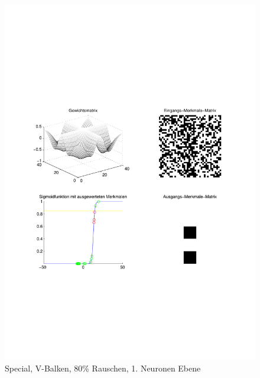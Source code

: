 \begin{figure}[hbt]
	\begin{minipage}{0.8 \textwidth}
		\includegraphics[width=\textwidth]{./Bilder/Auswertung/Endergebnis/TypeSpecial_Rauschen80_V_Line_Layer1}
		\caption{Special, V-Balken, 80\% Rauschen, 1. Neuronen Ebene}
		\label{Special_V_80_1}
	\end{minipage}
	\vfill
	\begin{minipage}{0.8 \textwidth}

\end{minipage}
\end{figure}
